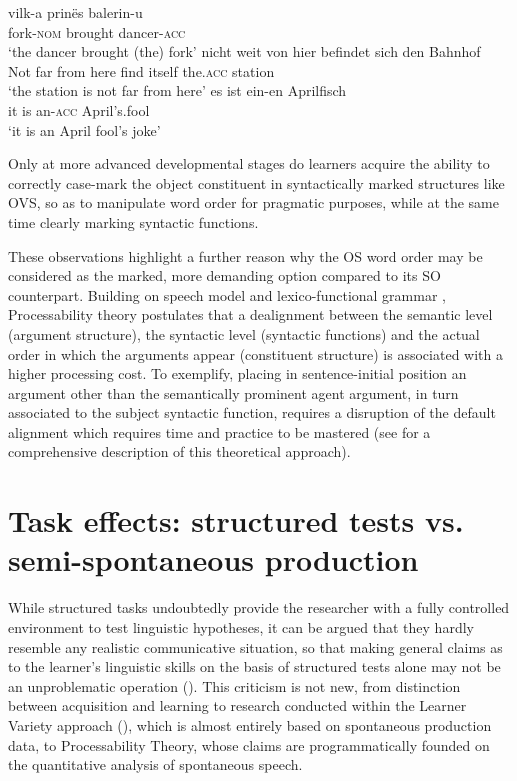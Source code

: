 \ea%
    \label{ex:01:5}
    \ea\label{ex:01:5a}
    \gll    vilk-a prinës balerin-u\\
            fork-\textsc{nom}  brought  dancer-\textsc{acc}\\
    \glt    ‘the dancer brought (the) fork’
    \ex\label{ex:01:5b}
    \gll    nicht weit von hier befindet sich den Bahnhof \\
            Not far from here  find    itself  the.\textsc{acc}  station\\
    \glt    ‘the station is not far from here’
    \ex\label{ex:01:5c}
    \gll    es ist ein-en Aprilfisch\\
            it   is   an-\textsc{acc}   April's.fool\\
    \glt    ‘it is an April fool's joke’
    \z
\z

Only at more advanced developmental stages do learners acquire the ability to correctly case-mark the object constituent in syntactically marked structures like OVS, so as to manipulate word order for pragmatic purposes, while at the same time clearly marking syntactic functions. 

These observations highlight a further reason why the OS word order may be considered as the marked, more demanding option compared to its SO counterpart. Building on  speech model and lexico-functional grammar \citep{Bresnan2001}, Processability theory postulates that a dealignment between the semantic level (argument structure), the syntactic level (syntactic functions) and the actual order in which the arguments appear (constituent structure) is associated with a higher processing cost. To exemplify, placing in sentence-initial position an argument other than the semantically prominent agent argument, in turn associated to the subject syntactic function, requires a disruption of the default alignment which requires time and practice to be mastered (see \citealt{BettoniDi-Biase2015} for a comprehensive description of this theoretical approach).

\section{Task effects: structured tests vs. semi-spontaneous production}\label{sec:01:2}

While structured tasks undoubtedly provide the researcher with a fully controlled environment to test linguistic hypotheses, it can be argued that they hardly resemble any realistic communicative situation, so that making general claims as to the learner’s linguistic skills on the basis of structured tests alone may not be an unproblematic operation (\citealt[289—290]{Ellis1985}). This criticism is not new, from  distinction between acquisition and learning to research conducted within the Learner Variety approach (\citealt{Perdue1993, Perdue1996, Starren2001, Bernini2003, Giacalone-Ramat2003}), which is almost entirely based on spontaneous production data, to Processability Theory, whose claims are programmatically founded on the quantitative analysis of spontaneous speech. 


